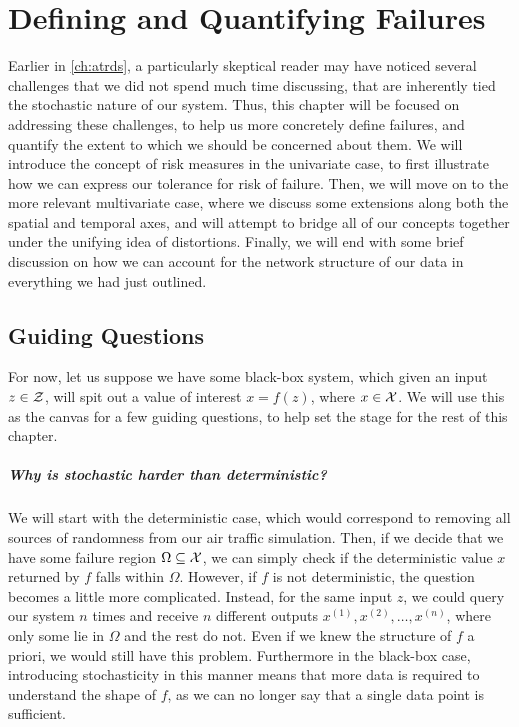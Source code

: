 \chapter{Defining and Quantifying Failures}
\label{app:risk}

Earlier in \cref{ch:atrds}, a particularly skeptical reader may have noticed several challenges that we did not spend much time discussing, that are inherently tied the stochastic nature of our system. Thus, this chapter will be focused on addressing these challenges, to help us more concretely define failures, and quantify the extent to which we should be concerned about them. We will introduce the concept of risk measures in the univariate case, to first illustrate how we can express our tolerance for risk of failure. Then, we will move on to the more relevant multivariate case, where we discuss some extensions along both the spatial and temporal axes, and will attempt to bridge all of our concepts together under the unifying idea of distortions. Finally, we will end with some brief discussion on how we can account for the network structure of our data in everything we had just outlined.

\section{Guiding Questions}
\label{sec:risk-questions}
For now, let us suppose we have some black-box system, which given an input $z\in \mathcal{Z}$, will spit out a value of interest $x=f(z)$, where $x\in \mathcal{X}$. We will use this as the canvas for a few guiding questions, to help set the stage for the rest of this chapter.

\paragraph{Why is stochastic harder than deterministic?} We will start with the deterministic case, which would correspond to removing all sources of randomness from our air traffic simulation. Then, if we decide that we have some failure region $\Omega\subseteq \mathcal{X}$, we can simply check if the deterministic value $x$ returned by $f$ falls within $\Omega$. However, if $f$ is not deterministic, the question becomes a little more complicated. Instead, for the same input $z$, we could query our system $n$ times and receive $n$ different outputs $x^{(1)},x^{(2)},\ldots, x^{(n)}$, where only some lie in $\Omega$ and the rest do not. Even if we knew the structure of $f$ a priori, we would still have this problem. Furthermore in the black-box case, introducing stochasticity in this manner means that more data is required to understand the shape of $f$, as we can no longer say that a single data point is sufficient.

